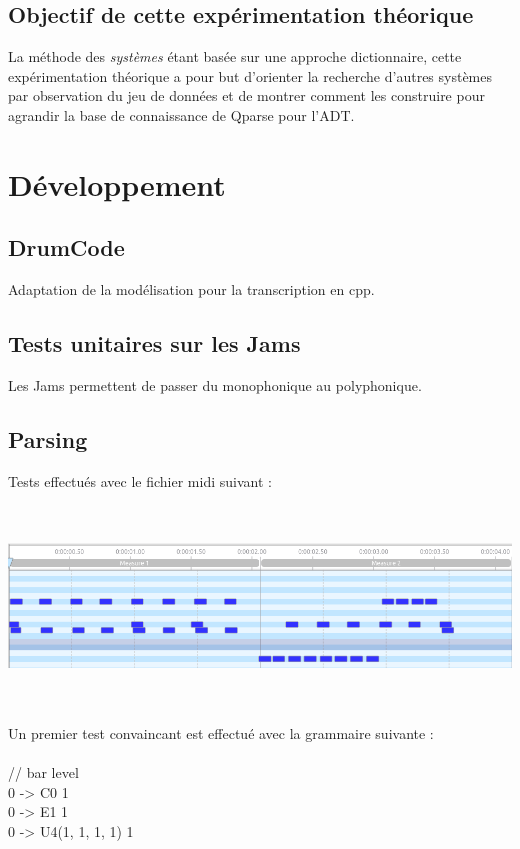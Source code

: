 \subsection*{Objectif de cette expérimentation théorique}
La méthode des \textit{systèmes} étant basée sur une approche dictionnaire, cette expérimentation théorique a pour but d’orienter la recherche d’autres systèmes par observation du jeu de données et de montrer comment les construire pour agrandir la base de connaissance de Qparse pour l’ADT.
\newpage
\section{Développement}
\subsection*{DrumCode}
Adaptation de la modélisation pour la transcription en cpp.
\subsection*{Tests unitaires sur les Jams}
\label{jam_tests}
Les Jams permettent de passer du monophonique au polyphonique.
\subsection*{Parsing}
\label{gram_pond}
Tests effectués avec le fichier midi suivant :\\\\
\includegraphics[height=50mm, width=160mm]{z_images/4_experimentations/3_developpement/0_midi_2bars_fill.png}\\\\
Un premier test convaincant est effectué avec la grammaire suivante :\\\\
// bar level\\
0 -> C0                1\\
0 -> E1                1\\
0 -> U4(1, 1, 1, 1)    1\\

